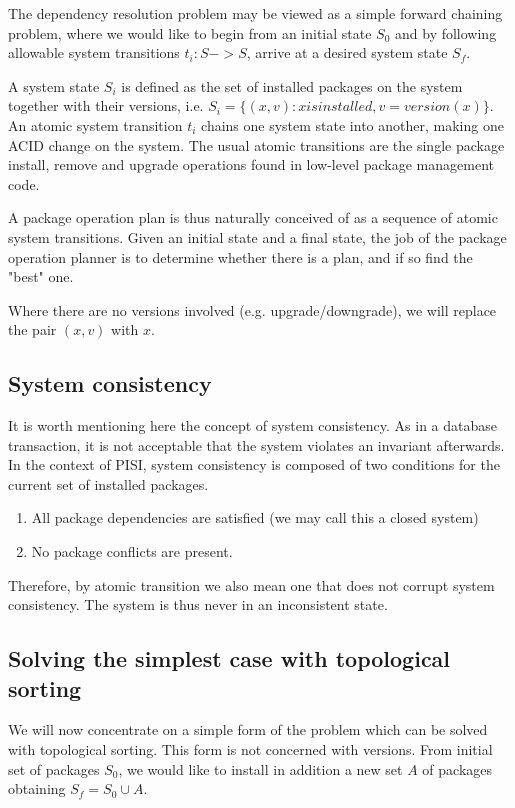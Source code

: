 \documentclass[a4paper,11pt]{article}
\begin{document}
The dependency resolution problem may be viewed as a simple forward
chaining problem, where we would like to begin from an initial state
$S_0$ and by following allowable system transitions $t_i: S -> S$, 
arrive at a desired system state $S_f$.

A system state $S_i$ is defined as the set of installed packages on the
system together with their versions, i.e. $S_i = \{  (x,v) : x is
installed, v=version(x)\} $. An atomic system transition $t_i$ chains one
system state into another, making one ACID change on the system. The
usual atomic transitions are the single package install, remove and
upgrade operations found in low-level package management code.

A package operation plan is thus naturally conceived of as a sequence
of atomic system transitions. Given an initial state and a final
state, the job of the package operation planner is to determine
whether there is a plan, and if so find the "best" one.

Where there are no versions involved (e.g. upgrade/downgrade), we will
replace the pair $(x,v)$ with $x$.

\subsection{System consistency}

It is worth mentioning here the concept of system consistency. As in a
database transaction, it is not acceptable that the system violates an
invariant afterwards. In the context of PISI, system consistency is
composed of two conditions for the current set of installed packages.
\begin{enumerate}
\item All package dependencies are satisfied (we may call this a
  closed system)
\item No package conflicts are present.
\end{enumerate}

Therefore, by atomic transition we also mean one that does not corrupt
system consistency. The system is thus never in an inconsistent state.


\subsection{Solving the simplest case with topological sorting}

We will now concentrate on a simple form of the problem which can
be solved with topological sorting. This form is not concerned with
versions. From initial set of packages $S_0$, we would like to
install in addition a new set $A$ of packages obtaining $S_f = S_0 \cup
A$.
\end{document}
